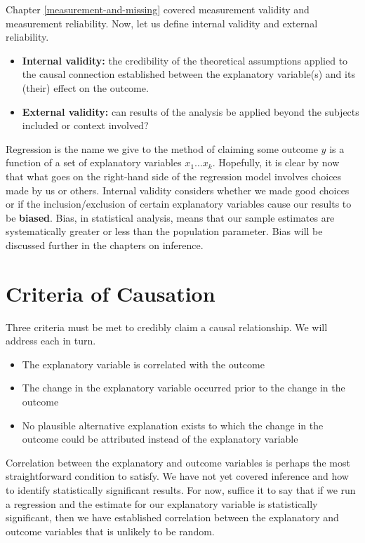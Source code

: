 \documentclass[
]{book}
\providecommand{\tightlist}{%
  \setlength{\itemsep}{0pt}\setlength{\parskip}{0pt}}
\begin{document}
Chapter \ref{measurement-and-missing} covered measurement validity and measurement reliability. Now, let us define internal validity and external reliability.

\begin{itemize}
\tightlist
\item
  \textbf{Internal validity:} the credibility of the theoretical assumptions applied to the causal connection established between the explanatory variable(s) and its (their) effect on the outcome.
\item
  \textbf{External validity:} can results of the analysis be applied beyond the subjects included or context involved?
\end{itemize}

Regression is the name we give to the method of claiming some outcome \(y\) is a function of a set of explanatory variables \(x_1 \dots x_k\). Hopefully, it is clear by now that what goes on the right-hand side of the regression model involves choices made by us or others. Internal validity considers whether we made good choices or if the inclusion/exclusion of certain explanatory variables cause our results to be \textbf{biased}. Bias, in statistical analysis, means that our sample estimates are systematically greater or less than the population parameter. Bias will be discussed further in the chapters on inference.

\hypertarget{criteria-of-causation}{%
\section{Criteria of Causation}\label{criteria-of-causation}}

Three criteria must be met to credibly claim a causal relationship. We will address each in turn.

\begin{itemize}
\tightlist
\item
  The explanatory variable is correlated with the outcome
\item
  The change in the explanatory variable occurred prior to the change in the outcome
\item
  No plausible alternative explanation exists to which the change in the outcome could be attributed instead of the explanatory variable
\end{itemize}

Correlation between the explanatory and outcome variables is perhaps the most straightforward condition to satisfy. We have not yet covered inference and how to identify statistically significant results. For now, suffice it to say that if we run a regression and the estimate for our explanatory variable is statistically significant, then we have established correlation between the explanatory and outcome variables that is unlikely to be random.
\end{document}

